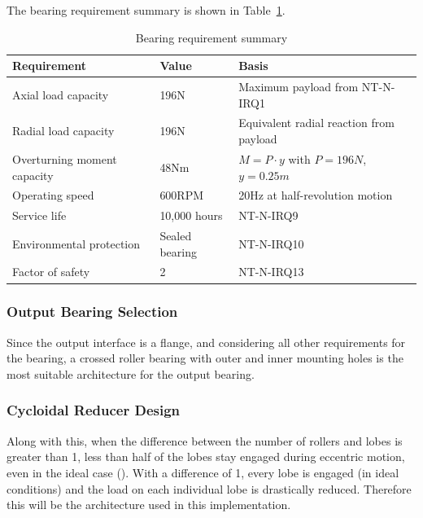 \documentclass[confidential]{../../../classes/nervtech-engdoc}
\begin{document}
The bearing requirement summary is shown in Table~\ref{tab:bearing-requirements}.
\begin{table}[H]
  \centering
  \caption{Bearing requirement summary}
  \label{tab:bearing-requirements}
  \begin{tabular}{|l|l|l|}
    \hline
    Requirement & Value & Basis \\
    \hline
    Axial load capacity & 196N & Maximum payload from NT-N-IRQ1 \\
    Radial load capacity & 196N & Equivalent radial reaction from payload \\
    Overturning moment capacity & 48Nm & $M = P \cdot y$ with $P = 196N$, $y = 0.25m$ \\
    Operating speed & 600RPM & 20Hz at half-revolution motion \\
    Service life & 10,000 hours & NT-N-IRQ9 \\
    Environmental protection & Sealed bearing & NT-N-IRQ10 \\
    Factor of safety & 2 & NT-N-IRQ13 \\
    \hline
  \end{tabular}
\end{table}

\subsubsection{Output Bearing Selection}
Since the output interface is a flange, and considering all other requirements for the bearing, a crossed roller bearing with outer and inner mounting holes is the most suitable architecture for the output bearing.


\subsubsection{Cycloidal Reducer Design}
Along with this, when the difference between the number of rollers and lobes is greater than 1, less than half of the lobes stay engaged during eccentric motion, even in the ideal case (\cite{CycloidalReducerLoadAnalysis}).
With a difference of 1, every lobe is engaged (in ideal conditions) and the load on each individual lobe is drastically reduced.
Therefore this will be the architecture used in this implementation.
\end{document}
